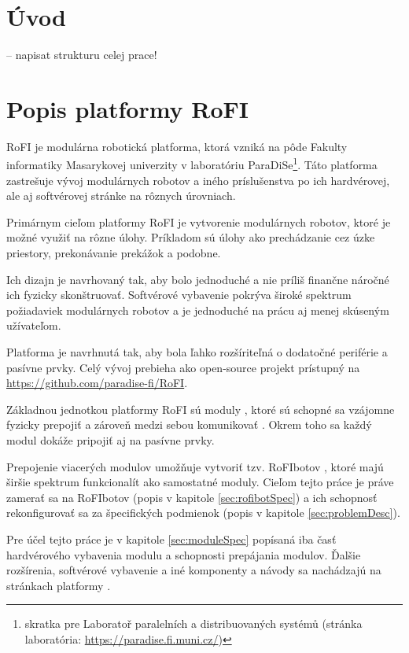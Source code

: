 \documentclass[
  digital, %
  oneside, %
  table,   %
  lof,     %
  nolot,     %
]{fithesis3}
\begin{document}
\chapter*{Úvod}
-- napisat strukturu celej prace!

\chapter{Popis platformy RoFI}
\label{sec:platform}
RoFI je modulárna robotická platforma, ktorá vzniká na pôde Fakulty informatiky Masarykovej univerzity v laboratóriu ParaDiSe\footnote{skratka pre Laboratoř paralelních a distribuovaných systémů (stránka laboratória: \url{https://paradise.fi.muni.cz/})}. Táto platforma zastrešuje vývoj modulárnych robotov a iného príslušenstva po ich hardvérovej, ale aj softvérovej stránke na rôznych úrovniach. 

Primárnym cieľom platformy RoFI je vytvorenie modulárnych robotov, ktoré je možné využiť na rôzne úlohy. Príkladom sú úlohy ako prechádzanie cez úzke priestory, prekonávanie prekážok a podobne. 

Ich dizajn je navrhovaný tak, aby bolo jednoduché a nie príliš finančne náročné ich fyzicky skonštruovať. Softvérové vybavenie pokrýva široké spektrum požiadaviek modulárnych robotov a je jednoduché na prácu aj menej skúseným užívateľom. 

Platforma je navrhnutá tak, aby bola ľahko rozšíriteľná o dodatočné periférie a pasívne prvky. Celý vývoj prebieha ako open-source projekt prístupný na \url{https://github.com/paradise-fi/RoFI}.  

Základnou jednotkou platformy RoFI sú moduly \cite{mrazekMasterThesis}, ktoré sú schopné sa vzájomne fyzicky prepojiť a zároveň medzi sebou komunikovať \cite{rofiCom}. Okrem toho sa každý modul dokáže pripojiť aj na pasívne prvky. 

Prepojenie viacerých modulov umožňuje vytvoriť tzv. RoFIbotov \cite{rofiWeb}, ktoré majú širšie spektrum funkcionalít ako samostatné moduly. Cieľom tejto práce je práve zamerať sa na RoFIbotov (popis v kapitole \ref{sec:rofibotSpec}) a ich schopnosť rekonfigurovať sa za špecifických podmienok (popis v kapitole \ref{sec:problemDesc}). 

Pre účel tejto práce je v kapitole \ref{sec:moduleSpec} popísaná iba časť hardvérového vybavenia modulu a schopnosti prepájania modulov. Ďalšie rozšírenia, softvérové vybavenie a iné komponenty a návody sa nachádzajú na stránkach platformy \cite{rofiWeb}. 
\end{document}
